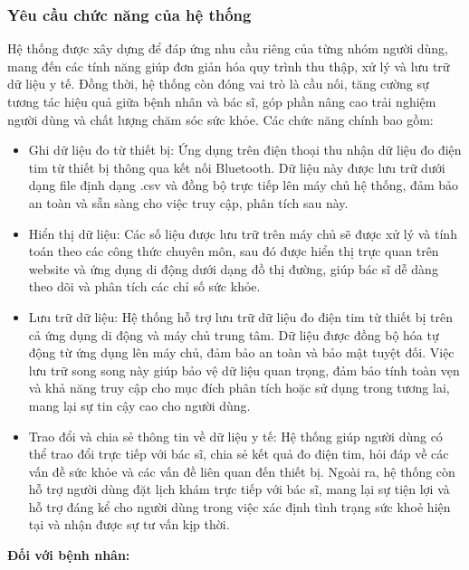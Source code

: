 \subsubsection{Yêu cầu chức năng của hệ thống}
Hệ thống được xây dựng để đáp ứng nhu cầu riêng của từng nhóm người dùng, mang đến các tính năng giúp đơn giản hóa quy trình thu thập, xử lý và lưu trữ dữ liệu y tế. Đồng thời, hệ thống còn đóng vai trò là cầu nối, tăng cường sự tương tác hiệu quả giữa bệnh nhân và bác sĩ, góp phần nâng cao trải nghiệm người dùng và chất lượng chăm sóc sức khỏe. Các chức năng chính bao gồm:
\begin{adjustwidth}{1.5em}{}
	\begin{itemize}
		\item Ghi dữ liệu đo từ thiết bị: Ứng dụng trên điện thoại thu nhận dữ liệu đo điện tim từ thiết bị thông qua kết nối Bluetooth.
		      Dữ liệu này được lưu trữ dưới dạng file định dạng .csv và đồng bộ trực tiếp lên máy chủ hệ thống, đảm bảo an toàn và sẵn sàng cho việc truy cập, phân tích sau này.
		\item Hiển thị dữ liệu: Các số liệu được lưu trữ trên máy chủ sẽ được xử lý và tính toán theo các công thức chuyên môn, sau đó được hiển thị trực quan trên website và ứng dụng di động dưới dạng đồ thị đường, giúp bác sĩ dễ dàng theo dõi và phân tích các chỉ số sức khỏe.
		\item Lưu trữ dữ liệu: Hệ thống hỗ trợ lưu trữ dữ liệu đo điện tim từ thiết bị trên cả ứng dụng di động và máy chủ trung tâm. Dữ liệu được đồng bộ hóa tự động từ ứng dụng lên máy chủ, đảm bảo an toàn và bảo mật tuyệt đối. Việc lưu trữ song song này giúp bảo vệ dữ liệu quan trọng, đảm bảo tính toàn vẹn và khả năng truy cập cho mục đích phân tích hoặc sử dụng trong tương lai, mang lại sự tin cậy cao cho người dùng.
		\item Trao đổi và chia sẻ thông tin về dữ liệu y tế: Hệ thống giúp người dùng có thể trao đổi trực tiếp với bác sĩ, chia sẻ kết quả đo điện tim, hỏi đáp về các vấn đề sức khỏe và các vấn đề liên quan đến thiết bị. Ngoài ra, hệ thống còn hỗ trợ người dùng đặt lịch khám trực tiếp với bác sĩ, mang lại sự tiện lợi và hỗ trợ đáng kể cho người dùng trong việc xác định tình trạng sức khoẻ hiện tại và nhận được sự tư vấn kịp thời.
	\end{itemize}
\end{adjustwidth}
\textbf{Đối với bệnh nhân:}
